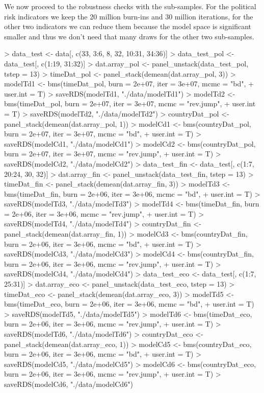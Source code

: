 \documentclass{article}
\begin{document}
We now proceed to the robustness checks with the sub-samples. For the political risk indicators we keep the 20 million burn-ins and 30 million iterations, for the other two indicators we can reduce them because the model space is significant smaller and thus we don't need that many draws for the other two sub-samples.
\begin{Schunk}
\begin{Sinput}
> data_test <- data[, c(33, 3:6, 8, 32, 10:31, 34:36)]
> data_test_pol <- data_test[, c(1:19, 31:32)]
> dat.array_pol <- panel_unstack(data_test_pol, tstep = 13)
> timeDat_pol <- panel_stack(demean(dat.array_pol, 3))
> modelTd1 <- bms(timeDat_pol, burn = 2e+07, iter = 3e+07, mcmc = "bd", 
+     user.int = T)
> saveRDS(modelTd1, "./data/modelTd1")
> modelTd2 <- bms(timeDat_pol, burn = 2e+07, iter = 3e+07, mcmc = "rev.jump", 
+     user.int = T)
> saveRDS(modelTd2, "./data/modelTd2")
> countryDat_pol <- panel_stack(demean(dat.array_pol, 1))
> modelCd1 <- bms(countryDat_pol, burn = 2e+07, iter = 3e+07, mcmc = "bd", 
+     user.int = T)
> saveRDS(modelCd1, "./data/modelCd1")
> modelCd2 <- bms(countryDat_pol, burn = 2e+07, iter = 3e+07, mcmc = "rev.jump", 
+     user.int = T)
> saveRDS(modelCd2, "./data/modelCd2")
> data_test_fin <- data_test[, c(1:7, 20:24, 30, 32)]
> dat.array_fin <- panel_unstack(data_test_fin, tstep = 13)
> timeDat_fin <- panel_stack(demean(dat.array_fin, 3))
> modelTd3 <- bms(timeDat_fin, burn = 2e+06, iter = 3e+06, mcmc = "bd", 
+     user.int = T)
> saveRDS(modelTd3, "./data/modelTd3")
> modelTd4 <- bms(timeDat_fin, burn = 2e+06, iter = 3e+06, mcmc = "rev.jump", 
+     user.int = T)
> saveRDS(modelTd4, "./data/modelTd4")
> countryDat_fin <- panel_stack(demean(dat.array_fin, 1))
> modelCd3 <- bms(countryDat_fin, burn = 2e+06, iter = 3e+06, mcmc = "bd", 
+     user.int = T)
> saveRDS(modelCd3, "./data/modelCd3")
> modelCd4 <- bms(countryDat_fin, burn = 2e+06, iter = 3e+06, mcmc = "rev.jump", 
+     user.int = T)
> saveRDS(modelCd4, "./data/modelCd4")
> data_test_eco <- data_test[, c(1:7, 25:31)]
> dat.array_eco <- panel_unstack(data_test_eco, tstep = 13)
> timeDat_eco <- panel_stack(demean(dat.array_eco, 3))
> modelTd5 <- bms(timeDat_eco, burn = 2e+06, iter = 3e+06, mcmc = "bd", 
+     user.int = T)
> saveRDS(modelTd5, "./data/modelTd5")
> modelTd6 <- bms(timeDat_eco, burn = 2e+06, iter = 3e+06, mcmc = "rev.jump", 
+     user.int = T)
> saveRDS(modelTd6, "./data/modelTd6")
> countryDat_eco <- panel_stack(demean(dat.array_eco, 1))
> modelCd5 <- bms(countryDat_eco, burn = 2e+06, iter = 3e+06, mcmc = "bd", 
+     user.int = T)
> saveRDS(modelCd5, "./data/modelCd5")
> modelCd6 <- bms(countryDat_eco, burn = 2e+06, iter = 3e+06, mcmc = "rev.jump", 
+     user.int = T)
> saveRDS(modelCd6, "./data/modelCd6")
\end{Sinput}
\end{Schunk}
\end{document}
